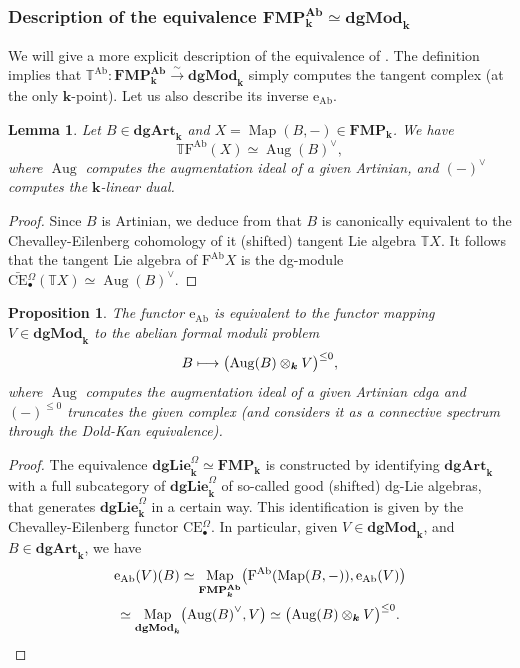 \documentclass[JEP,XML,SOM,Unicode,NoEqCountersInSection]{cedram}
\let\autoref\Cref
\newcommand\mto{\mathchoice{\longmapsto}{\mapsto}{\mapsto}{\mapsto}}
\newcommand{\isom}{\stackrel{\sim}{\longrightarrow}}
\let\widebar\bar
\newcommand{\sbullet}{{\scriptscriptstyle\bullet}}
\newtheorem{lem}[thm]{Lemma}
\newtheorem{prop}[thm]{Proposition}
\theoremstyle{definition}
\newcommand{\T}{\mathbb{T}}
\newcommand{\dual}[1]{{#1}^{\vee}}
\newcommand{\dgArt}{\mathbf{dgArt}}
\newcommand{\dgLie}{\mathbf{dgLie}}
\newcommand{\dgMod}{\mathbf{dgMod}}
\DeclareMathOperator{\Map}{Map}
\let\originalleft\left
\let\originalright\right
\renewcommand{\left}{\mathopen{}\mathclose\bgroup\originalleft}
\renewcommand{\right}{\aftergroup\egroup\originalright}
\newcommand{\FMP}{\mathbf{FMP}}
\newcommand{\Aug}{\operatorname{Aug}}
\newcommand{\FAb}{\operatorname{F^{Ab}}}
\newcommand{\Ab}{\mathbf{Ab}}
\renewcommand{\k}{{\boldsymbol{k}}}
\newcommand{\eAb}{\operatorname{e_{Ab}}}
\newcommand{\TAb}{\operatorname{\T^{Ab}}}
\newcommand{\bCEO}{\widebar{\mathrm{CE}}{}^\Omega_\sbullet}
\newcommand{\CEO}{\mathrm{CE}{}^\Omega_\sbullet}
\begin{document}
\subsubsection{Description of the equivalence $\FMP_\k^\Ab \simeq \dgMod_\k$}

We will give a more expli\-cit description of the equivalence of \autoref{prop:abelianlie}. The definition implies that $\TAb \colon \FMP_\k^\Ab \isom \dgMod_\k$ simply computes the tangent complex (at the only $\k$\nobreakdash-point). Let us also describe its inverse $\eAb$.

\begin{lem}\label{lem:abelianization}
Let $B \in \dgArt_\k$ and $X = \Map(B,-) \in \FMP_\k$.
We have
\[
\T \FAb(X) \simeq \dual{\Aug(B)},
\]
where $\Aug$ computes the augmentation ideal of a given Artinian, and $\dual{(-)}$ computes the $\k$-linear dual.
\end{lem}

\begin{proof}
Since $B$ is Artinian, we deduce from \autoref{lem:BsimCDB} that $B$ is canonically equivalent to the Chevalley-Eilenberg cohomology of it (shifted) tangent Lie algebra $\T X$.
It follows that the tangent Lie algebra of $\FAb X$ is the dg-module $\bCEO(\T X) \simeq \dual{\Aug (B)}$.
\end{proof}

\begin{prop}\label{prop:calceAb}
The functor $\eAb$ is equivalent to the functor mapping $V \in \dgMod_\k$ to the abelian formal moduli problem
\[
B \mto \bigl(\Aug(B) \otimes_\k V \bigr)^{\leq 0},
\]
where $\Aug$ computes the augmentation ideal of a given Artinian cdga and $(-)^{\leq 0}$ truncates the given complex (and considers it as a connective spectrum through the Dold-Kan equivalence).
\end{prop}

\begin{proof}
The equivalence $\dgLie^\Omega_\k \simeq \FMP_\k$ is constructed by identifying $\dgArt_\k$ with a full subcategory of $\dgLie^\Omega_\k$ of so-called good (shifted) dg-Lie algebras, that generates $\dgLie_\k^\Omega$ in a certain way. This identification is given by the Chevalley-Eilenberg functor $\CEO$.
In particular, given $V \in \dgMod_\k$, and $B \in \dgArt_\k$, we have
\begin{multline*}
\eAb(V)(B) \simeq \Map_{\FMP_\k^\Ab}\left(\FAb(\Map(B,-)), \eAb(V)\right) \\ \simeq \Map_{\dgMod_\k}\bigl( \dual{\Aug(B)}, V\bigr) \simeq \bigl(\Aug(B) \otimes_\k V \bigr)^{\leq 0}.\qedhere
\end{multline*}
\end{proof}
\end{document}

